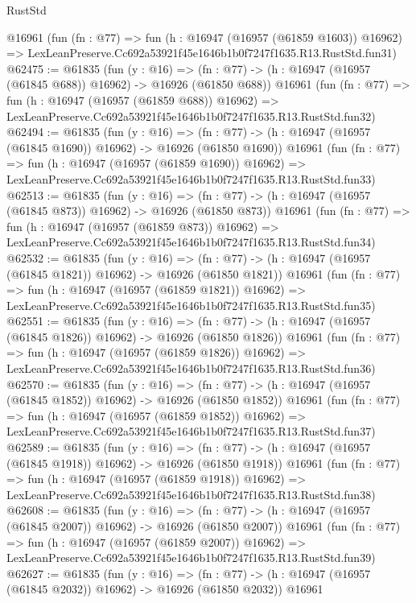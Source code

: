 \begin{lexlean}{RustStd}
\begin{coremodule}
    @16961
    (fun (fn : @77) =>
    fun (h : @16947 (@16957 (@61859 @1603)) @16962) =>
    LexLeanPreserve.Cc692a53921f45e1646b1b0f7247f1635.R13.RustStd.fun31)
@62475 := @61835
    (fun (y : @16) =>
    (fn : @77) -> (h : @16947 (@16957 (@61845 @688)) @16962) -> @16926 (@61850 @688))
    @16961
    (fun (fn : @77) =>
    fun (h : @16947 (@16957 (@61859 @688)) @16962) =>
    LexLeanPreserve.Cc692a53921f45e1646b1b0f7247f1635.R13.RustStd.fun32)
@62494 := @61835
    (fun (y : @16) =>
    (fn : @77) -> (h : @16947 (@16957 (@61845 @1690)) @16962) -> @16926 (@61850 @1690))
    @16961
    (fun (fn : @77) =>
    fun (h : @16947 (@16957 (@61859 @1690)) @16962) =>
    LexLeanPreserve.Cc692a53921f45e1646b1b0f7247f1635.R13.RustStd.fun33)
@62513 := @61835
    (fun (y : @16) =>
    (fn : @77) -> (h : @16947 (@16957 (@61845 @873)) @16962) -> @16926 (@61850 @873))
    @16961
    (fun (fn : @77) =>
    fun (h : @16947 (@16957 (@61859 @873)) @16962) =>
    LexLeanPreserve.Cc692a53921f45e1646b1b0f7247f1635.R13.RustStd.fun34)
@62532 := @61835
    (fun (y : @16) =>
    (fn : @77) -> (h : @16947 (@16957 (@61845 @1821)) @16962) -> @16926 (@61850 @1821))
    @16961
    (fun (fn : @77) =>
    fun (h : @16947 (@16957 (@61859 @1821)) @16962) =>
    LexLeanPreserve.Cc692a53921f45e1646b1b0f7247f1635.R13.RustStd.fun35)
@62551 := @61835
    (fun (y : @16) =>
    (fn : @77) -> (h : @16947 (@16957 (@61845 @1826)) @16962) -> @16926 (@61850 @1826))
    @16961
    (fun (fn : @77) =>
    fun (h : @16947 (@16957 (@61859 @1826)) @16962) =>
    LexLeanPreserve.Cc692a53921f45e1646b1b0f7247f1635.R13.RustStd.fun36)
@62570 := @61835
    (fun (y : @16) =>
    (fn : @77) -> (h : @16947 (@16957 (@61845 @1852)) @16962) -> @16926 (@61850 @1852))
    @16961
    (fun (fn : @77) =>
    fun (h : @16947 (@16957 (@61859 @1852)) @16962) =>
    LexLeanPreserve.Cc692a53921f45e1646b1b0f7247f1635.R13.RustStd.fun37)
@62589 := @61835
    (fun (y : @16) =>
    (fn : @77) -> (h : @16947 (@16957 (@61845 @1918)) @16962) -> @16926 (@61850 @1918))
    @16961
    (fun (fn : @77) =>
    fun (h : @16947 (@16957 (@61859 @1918)) @16962) =>
    LexLeanPreserve.Cc692a53921f45e1646b1b0f7247f1635.R13.RustStd.fun38)
@62608 := @61835
    (fun (y : @16) =>
    (fn : @77) -> (h : @16947 (@16957 (@61845 @2007)) @16962) -> @16926 (@61850 @2007))
    @16961
    (fun (fn : @77) =>
    fun (h : @16947 (@16957 (@61859 @2007)) @16962) =>
    LexLeanPreserve.Cc692a53921f45e1646b1b0f7247f1635.R13.RustStd.fun39)
@62627 := @61835
    (fun (y : @16) =>
    (fn : @77) -> (h : @16947 (@16957 (@61845 @2032)) @16962) -> @16926 (@61850 @2032))
    @16961

\end{coremodule}
\end{lexlean}
